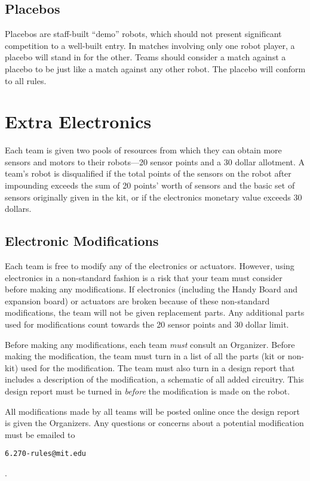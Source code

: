 \subsection{Placebos}

Placebos are staff-built ``demo'' robots, which should not present
significant competition to a well-built entry. In matches involving
only one robot player, a placebo will stand in for the other.  Teams
should consider a match against a placebo to be just like a match
against any other robot. The placebo will conform to all rules.

\section{Extra Electronics}

Each team is given two pools of resources from which they can obtain more
sensors and motors to their robots---20 sensor points and a 30 dollar allotment.
A team's robot is disqualified if the total points of the sensors on the robot
after impounding exceeds the sum of 20 points' worth of sensors and the basic
set of sensors originally given in the kit, or if the electronics monetary value
exceeds 30 dollars.

\subsection{Electronic Modifications}

Each team is free to modify any of the electronics or actuators. However, using
electronics in a non-standard fashion is a risk that your team must consider
before making any modifications. If electronics (including the Handy Board and
expansion board) or actuators are broken because of these non-standard
modifications, the team will not be given replacement parts. Any additional
parts used for modifications count towards the 20 sensor points and 30 dollar
limit.

Before making any modifications, each team {\em must} consult an Organizer.
Before making the modification, the team must turn in a list of all the parts
(kit or non-kit) used for the modification. The team must also turn in a design
report that includes a description of the modification, a schematic of all added
circuitry. This design report must be turned in {\em before} the modification is
made on the robot. 

All modifications made by all teams will be posted online once the design report
is given the Organizers.  Any questions or concerns about a potential
modification must be emailed to
\begin{verbatim}6.270-rules@mit.edu\end{verbatim}. 

